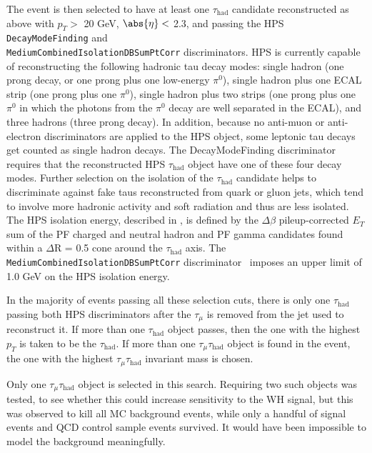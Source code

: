 The event is then selected to have at least one $\tau_{\text{had}}$ candidate reconstructed as above with $p_T >$ 20 GeV, $\abs{\eta} <$ 2.3, and passing the HPS \texttt{DecayModeFinding} and \texttt{\\MediumCombinedIsolationDBSumPtCorr} discriminators. HPS is currently capable of reconstructing the following hadronic tau decay modes: single hadron (one prong decay, or one prong plus one low-energy $\pi^0$), single hadron plus one ECAL strip (one prong plus one $\pi^0$), single hadron plus two strips (one prong plus one $\pi^0$ in which the photons from the $\pi^0$ decay are well separated in the ECAL), and three hadrons (three prong decay). In addition, because no anti-muon or anti-electron discriminators are applied to the HPS object, some leptonic tau decays get counted as single hadron decays.  The DecayModeFinding discriminator requires that the reconstructed HPS $\tau_{\text{had}}$ object have one of these four decay modes. Further selection on the isolation of the $\tau_{\text{had}}$ candidate helps to discriminate against fake taus reconstructed from quark or gluon jets, which tend to involve more hadronic activity and soft radiation and thus are less isolated.  The HPS isolation energy, described in \cite{CMS_AN_2010-082}, is defined by the $\Delta\beta$ pileup-corrected $E_T$ sum of the PF charged and neutral hadron and PF gamma candidates found within a $\Delta$R = 0.5 cone around the $\tau_{\text{had}}$ axis.  The \texttt{MediumCombinedIsolationDBSumPtCorr} discriminator~\cite{CMS:tauidtwiki} imposes an upper limit of 1.0 GeV on the HPS isolation energy.

In the majority of events passing all these selection cuts, there is only one $\tau_{\text{had}}$ passing both HPS discriminators after the $\tau_{\mu}$ is removed from the jet used to reconstruct it. If more than one $\tau_{\text{had}}$ object passes, then the one with the highest $p_T$ is taken to be the $\tau_{\text{had}}$. If more than one $\tau_{\mu}\tau_{\text{had}}$ object is found in the event, the one with the highest $\tau_{\mu}\tau_{\text{had}}$ invariant mass is chosen.

Only one $\tau_{\mu}\tau_{\text{had}}$ object is selected in this search. Requiring two such objects was tested, to see whether this could increase sensitivity to the WH signal, but this was observed to kill all MC background events, while only a handful of signal events and QCD control sample events survived.  It would have been impossible to model the background meaningfully.

